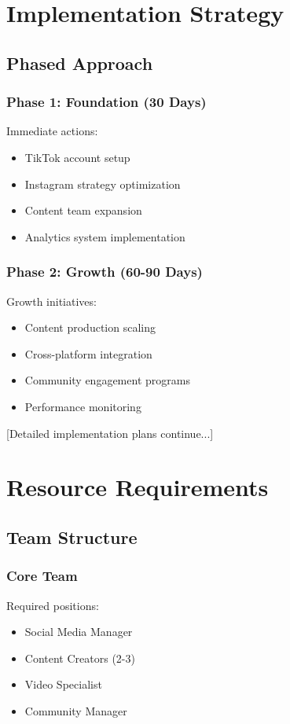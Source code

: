 \documentclass[12pt]{report}
\begin{document}
\chapter{Implementation Strategy}

\section{Phased Approach}
\subsection{Phase 1: Foundation (30 Days)}
Immediate actions:
\begin{itemize}
    \item TikTok account setup
    \item Instagram strategy optimization
    \item Content team expansion
    \item Analytics system implementation
\end{itemize}

\subsection{Phase 2: Growth (60-90 Days)}
Growth initiatives:
\begin{itemize}
    \item Content production scaling
    \item Cross-platform integration
    \item Community engagement programs
    \item Performance monitoring
\end{itemize}

[Detailed implementation plans continue...]

\chapter{Resource Requirements}

\section{Team Structure}
\subsection{Core Team}
Required positions:
\begin{itemize}
    \item Social Media Manager
    \item Content Creators (2-3)
    \item Video Specialist
    \item Community Manager
\end{itemize}
\end{document}
